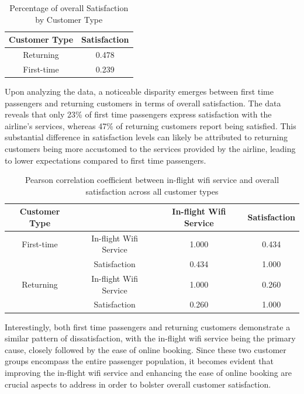 \documentclass[11pt]{article}
\begin{document}
\begin{table}[!h]
    \centering
    \begin{tabular}{|c|c|}
        \hline
        Customer Type &     Satisfaction \\
        \hline
        Returning   &     0.478 \\
        \hline
        First-time   &     0.239 \\
        \hline
    \end{tabular}
    \caption{\centering Percentage of overall Satisfaction by Customer Type}
    \label{tab:7-3-1}
\end{table}
        
Upon analyzing the data, a noticeable disparity emerges between first time passengers and returning customers in terms of overall satisfaction. The data reveals that only 23\% of first time passengers express satisfaction with the airline's services, whereas 47\% of returning customers report being satisfied. This substantial difference in satisfaction levels can likely be attributed to returning customers being more accustomed to the services provided by the airline, leading to lower expectations compared to first time passengers.

\begin{table}[!h]
    \centering
    \begin{tabular}{|c|c|c|c|}
        \hline
        Customer Type             &                         & In-flight Wifi Service  & Satisfaction \\
        \hline
        First-time                & In-flight Wifi Service  &        1.000  &       0.434 \\
        \hline
            & Satisfaction        &                0.434    &        1.000 \\
        \hline
        \hline
        Returning                 & In-flight Wifi Service  &        1.000  &       0.260 \\
        \hline
            & Satisfaction        &                0.260    &        1.000 \\
        \hline
    \end{tabular}
    \caption{\centering Pearson correlation coefficient between in-flight wifi service and overall satisfaction across all customer types}
    \label{tab:7-3-2}
\end{table}

Interestingly, both first time passengers and returning customers demonstrate a similar pattern of dissatisfaction, with the in-flight wifi service being the primary cause, closely followed by the ease of online booking. Since these two customer groups encompass the entire passenger population, it becomes evident that improving the in-flight wifi service and enhancing the ease of online booking are crucial aspects to address in order to bolster overall customer satisfaction.
\end{document}
